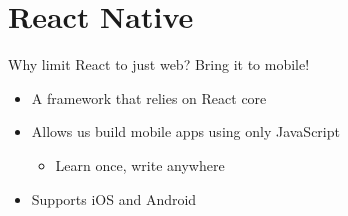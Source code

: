 \section{React Native}
Why limit React to just web? Bring it to mobile!
\begin{itemize}
	\item A framework that relies on React core
	\item Allows us build mobile apps using only JavaScript
	      \begin{itemize}
		      \item Learn once, write anywhere
	      \end{itemize}
	\item Supports iOS and Android
\end{itemize}